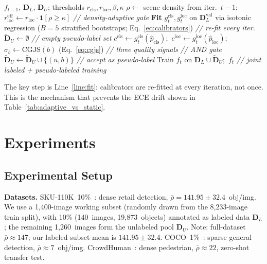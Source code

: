 \documentclass[10pt,twocolumn,letterpaper]{article}
\newcommand{\coco}{\textsc{COCO}\xspace}
\newcommand{\sku}{\textsc{SKU-110K}\xspace}
\begin{document}
\begin{algorithm}[t]
  \caption{CalibPL Self-Training (One Iteration)}
  \label{alg:calibpl}
  \footnotesize
  \begin{algorithmic}[1]
    \Require $f_{t-1}$, $\mathbf{D}_L$, $\mathbf{D}_U$; thresholds $r_\text{cls},r_\text{loc},\beta,\kappa$
    \State $\rho \leftarrow$ scene density from iter.~$t{-}1$;\ $r_\text{loc}^\text{eff} \leftarrow r_\text{loc}\cdot\mathbf{1}[\rho\ge\kappa]$ \hfill\textit{// density-adaptive gate}
    \State \textbf{Fit} $g_t^\text{cls},g_t^\text{loc}$ on $\mathbf{D}_L^\text{val}$ via isotonic regression ($B{=}5$ stratified bootstraps; Eq.~\ref{eq:calibrators}) \hfill\textit{// re-fit every iter.}\label{line:fit}
    \State $\widetilde{\mathbf{D}}_U\leftarrow\emptyset$ \hfill\textit{// empty pseudo-label set}
      \State $c^\text{cls}\!\leftarrow\!g_t^\text{cls}(\hat{p}_\text{cls})$;\ $c^\text{loc}\!\leftarrow\!g_t^\text{loc}(\hat{p}_\text{loc})$;\ $\sigma_b\!\leftarrow\!\text{CGJS}(b)$ (Eq.~\ref{eq:cgjs}) \hfill\textit{// three quality signals}
       \hfill\textit{// AND gate}
        \State $\widetilde{\mathbf{D}}_U\leftarrow\widetilde{\mathbf{D}}_U\cup\{(u,b)\}$ \hfill\textit{// accept as pseudo-label}
      \EndIf
    \EndFor
    \State Train $f_t$ on $\mathbf{D}_L\cup\widetilde{\mathbf{D}}_U$;\ \Return $f_t$ \hfill\textit{// joint labeled + pseudo-labeled training}
  \end{algorithmic}
\end{algorithm}

The key step is Line~\ref{line:fit}: calibrators are re-fitted at every
iteration, not once. This is the mechanism that prevents the ECE drift
shown in Table~\ref{tab:adaptive_vs_static}.

\section{Experiments}
\label{sec:experiments}

\subsection{Experimental Setup}

\textbf{Datasets.}
\sku\ 10\%~\cite{sku110k2019}: dense retail detection,
$\bar{\rho}{=}141.95{\pm}32.4$~obj/img. We use a 1,400-image working
subset (randomly drawn from the 8,233-image train split), with 10\% (140~images,
19,873~objects) annotated as labeled data $\mathbf{D}_L$; the remaining
1,260~images form the unlabeled pool $\mathbf{D}_U$. Note: full-dataset
$\bar\rho\!\approx\!147$; our labeled-subset mean is $141.95\!\pm\!32.4$. \coco\ 1\%~\cite{lin2014coco}: sparse general
detection, $\bar{\rho}{\approx}7$~obj/img. CrowdHuman~\cite{crowdhuman2018}:
dense pedestrian, $\bar{\rho}{\approx}22$, zero-shot transfer test.
\end{document}
